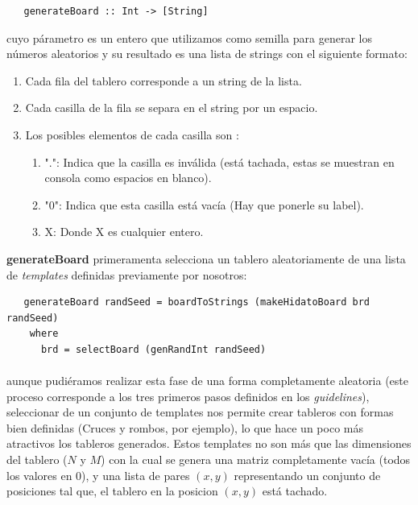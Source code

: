\documentclass[a4paper, 12pt]{article}
\begin{document}
\begin{verbatim}
   generateBoard :: Int -> [String]
\end{verbatim}

cuyo p\'arametro es un entero que utilizamos como semilla para generar los n\'umeros
aleatorios y su resultado es una lista de strings con el siguiente formato:

\begin{enumerate}
   \item Cada fila del tablero corresponde a un string de la lista.
   \item Cada casilla de la fila se separa en el string por un espacio.
   \item Los posibles elementos de cada casilla son :
         \begin{enumerate}
            \item ".": Indica que la casilla es inv\'alida (est\'a tachada, estas se muestran en consola como espacios en blanco).
            \item "0": Indica que esta casilla est\'a vac\'ia (Hay que ponerle su label).
            \item X: Donde X es cualquier entero.
         \end{enumerate}
\end{enumerate}

\textbf{generateBoard} primeramenta selecciona un tablero aleatoriamente de una lista de \textit{templates} definidas
previamente por nosotros:

\begin{verbatim}
   generateBoard randSeed = boardToStrings (makeHidatoBoard brd randSeed)
    where 
      brd = selectBoard (genRandInt randSeed)
\end{verbatim}

\paragraph{}
aunque pudi\'eramos realizar esta fase de una forma completamente aleatoria (este proceso corresponde a los tres primeros
pasos definidos en los \textit{guidelines}), seleccionar de un conjunto de templates nos permite crear tableros con formas
bien definidas (Cruces y rombos, por ejemplo), lo que hace un poco m\'as atractivos los tableros generados. Estos templates
no son m\'as que las dimensiones del tablero ($N$ y $M$) con la cual se genera una matriz completamente vac\'ia (todos los valores
en 0), y una lista de pares $(x,y)$ representando un conjunto de posiciones tal que, el tablero en la posicion $(x, y)$ est\'a tachado.
\end{document}

